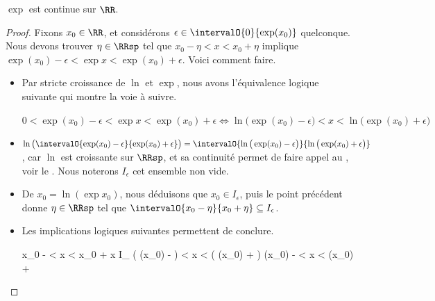 \begin{fact} \label{exp-cont}
	$\exp$ est continue sur $\RR$.
\end{fact}


\begin{proof}
	Fixons $x_0 \in \RR$, et considérons $\epsilon \in \intervalO{0}{\exp(x_0)}$ quelconque.
	Nous devons trouver $\eta \in \RRsp$ tel que
	$x_0 - \eta < x < x_0 + \eta$
	implique
	$\exp(x_0) - \epsilon < \exp x < \exp(x_0) + \epsilon$. Voici comment faire.
	\begin{itemize}
		\item Par stricte croissance de $\ln$ et $\exp$, nous avons l'équivalence logique suivante qui montre la voie à suivre. 

		\noindent$
			0 < \exp(x_0) - \epsilon < \exp x < \exp(x_0) + \epsilon
			\iff
			\ln \big( \exp(x_0) - \epsilon \big) < x < \ln \big( \exp(x_0) + \epsilon \big)
		$


		\item
		$\ln \big( \intervalO{\exp(x_0) - \epsilon}{\exp(x_0) + \epsilon} \big)
		=
		 \intervalO{\ln \big( \exp(x_0) - \epsilon \big)}{\ln \big( \exp(x_0) + \epsilon \big)}$,
		 car $\ln$ est croissante sur $\RRsp$, et sa continuité permet de faire appel au \tvi, voir le .
		Nous noterons $I_{\epsilon}$ cet ensemble non vide.


		\item De $x_0 = \ln(\exp x_0)$, nous déduisons que $x_0 \in I_{\epsilon}$,
		puis le point précédent donne $\eta \in \RRsp$ tel que
		$\intervalO{x_0 - \eta}{x_0 + \eta} \subseteq I_{\epsilon}$.


		\item Les implications logiques suivantes permettent de conclure.
		
		\smallskip
		\leavevmode\kern-19pt\begin{stepcalc}[style=ar*, ope=\implies]
			x_0 - \eta < x < x_0 + \eta
		\explnext*{$\intervalO{x_0 - \eta}{x_0 + \eta} \subseteq I_{\epsilon}$}{}
			x \in I_{\epsilon}
		\explnext{}
			\ln \big( \exp(x_0) - \epsilon \big) < x < \ln \big( \exp(x_0) + \epsilon \big)
			\exp(x_0) - \epsilon < \exp x < \exp(x_0) + \epsilon
		\end{stepcalc}
	\end{itemize}
	
	\null
	\vspace{-4.5ex}
\end{proof}




